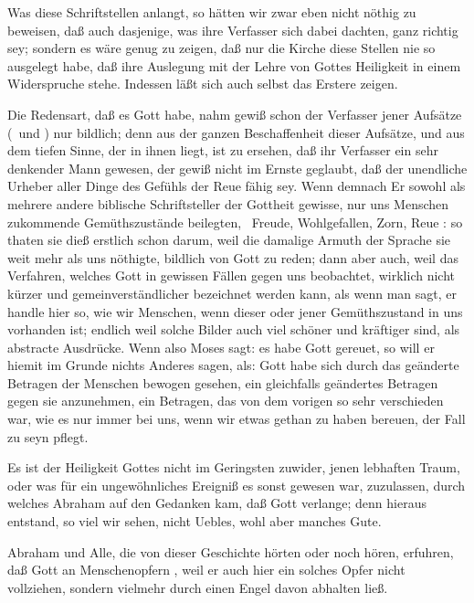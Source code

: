  Was diese Schriftstellen anlangt, so hätten wir zwar eben nicht nöthig zu beweisen, daß auch dasjenige, was ihre Verfasser sich dabei dachten, ganz richtig sey; sondern es wäre genug zu zeigen, daß nur die Kirche diese Stellen nie so ausgelegt habe, daß ihre Auslegung mit der Lehre von Gottes Heiligkeit in einem Widerspruche stehe. Indessen läßt sich auch selbst das Erstere zeigen.
\begin{aufzb}
\item Die Redensart, daß es Gott  habe, nahm gewiß schon der Verfasser jener Aufsätze (\ und ) nur bildlich; denn aus der ganzen Beschaffenheit dieser Aufsätze, und aus dem tiefen Sinne, der in ihnen liegt, ist zu ersehen, daß ihr Verfasser ein sehr denkender Mann gewesen, der gewiß nicht im Ernste geglaubt, daß der unendliche Urheber aller Dinge des Gefühls der Reue fähig sey. Wenn demnach Er sowohl als mehrere andere biblische Schriftsteller der Gottheit gewisse, nur uns Menschen zukommende Gemüthszustände beilegten, \zB\ Freude, Wohlgefallen, Zorn, Reue \udgl : so thaten sie dieß erstlich schon darum, weil die damalige Armuth der Sprache sie weit mehr als uns nöthigte, bildlich von Gott zu reden; dann aber auch, weil das Verfahren, welches Gott in gewissen Fällen gegen uns beobachtet, wirklich nicht kürzer und gemeinverständlicher bezeichnet werden kann, als wenn man sagt, er handle hier so, wie wir Menschen, wenn dieser oder jener Gemüthszustand in uns vorhanden ist; endlich weil solche Bilder auch viel schöner und kräftiger sind, als abstracte Ausdrücke. Wenn also Moses sagt: es habe Gott gereuet, so will er hiemit im Grunde nichts Anderes sagen, als: Gott habe sich durch das geänderte Betragen der Menschen bewogen gesehen, ein gleichfalls geändertes Betragen gegen sie anzunehmen, ein Betragen, das von dem vorigen so sehr verschieden war, wie es nur immer bei uns, wenn wir etwas gethan zu haben bereuen, der Fall zu seyn pflegt.
\item Es ist der Heiligkeit Gottes nicht im Geringsten zuwider, jenen lebhaften Traum, oder was für ein ungewöhnliches Ereigniß es sonst gewesen war, zuzulassen, durch welches Abraham auf den Gedanken kam, daß Gott  verlange; denn hieraus entstand, so viel wir sehen, nicht Uebles, wohl aber manches Gute.~
\begin{aufzc}
\item Abraham und Alle, die von dieser Geschichte hörten oder noch hören, erfuhren, daß Gott an Menschenopfern , weil er auch hier ein solches Opfer nicht vollziehen, sondern vielmehr durch einen Engel davon abhalten ließ.

\end{aufzc}
\end{aufzb}

